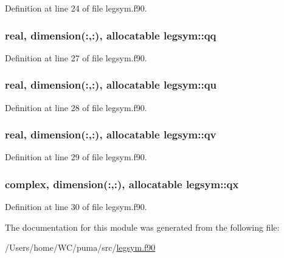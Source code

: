 \-Definition at line 24 of file legsym.\-f90.

\hypertarget{classlegsym_ae957dbe2cb8c53bef3e92d64bbea2785}{
\subsubsection[{qq}]{\setlength{\rightskip}{0pt plus 5cm}real, dimension(\-:,\-:), allocatable {\bf legsym\-::qq}}}
\label{classlegsym_ae957dbe2cb8c53bef3e92d64bbea2785}


\-Definition at line 27 of file legsym.\-f90.

\hypertarget{classlegsym_a9e9b5d567f315f6cf660a0b44ffb4889}{
\subsubsection[{qu}]{\setlength{\rightskip}{0pt plus 5cm}real, dimension(\-:,\-:), allocatable {\bf legsym\-::qu}}}
\label{classlegsym_a9e9b5d567f315f6cf660a0b44ffb4889}


\-Definition at line 28 of file legsym.\-f90.

\hypertarget{classlegsym_a9a8f54ece20fd3aacb5d1f1570450ee0}{
\subsubsection[{qv}]{\setlength{\rightskip}{0pt plus 5cm}real, dimension(\-:,\-:), allocatable {\bf legsym\-::qv}}}
\label{classlegsym_a9a8f54ece20fd3aacb5d1f1570450ee0}


\-Definition at line 29 of file legsym.\-f90.

\hypertarget{classlegsym_aff59025facb5c5b3d3717ca32328f587}{
\subsubsection[{qx}]{\setlength{\rightskip}{0pt plus 5cm}complex, dimension(\-:,\-:), allocatable {\bf legsym\-::qx}}}
\label{classlegsym_aff59025facb5c5b3d3717ca32328f587}


\-Definition at line 30 of file legsym.\-f90.



\-The documentation for this module was generated from the following file\-:\begin{DoxyCompactItemize}
\item 
/\-Users/home/\-W\-C/puma/src/\hyperlink{legsym_8f90}{legsym.\-f90}\end{DoxyCompactItemize}
